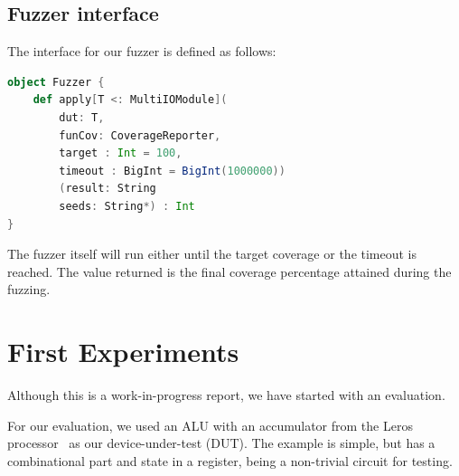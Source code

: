 \documentclass[conference]{IEEEtran}
\newcommand{\todo}[1]{{\color{olive} TODO: #1}}
\newcommand{\martin}[1]{{\color{blue} Martin: #1}}
\begin{document}

\subsection{Fuzzer interface}
The interface for our fuzzer is defined as follows:
\begin{lstlisting}[captionpos=b,caption={Interface for the ChiselVerify fuzzer. It takes as parameter a \texttt{dut} and \texttt{chiselverify.coverage.CoverageReporter}, which is the verification plan used to define the functional coverage that will drive the fuzzing. It also takes in a target coverage percentage between 0 and 100, which defaults to 100, and a timeout which is set by default to 1'000'000 inputs. The second set of parameters are a result output file name, where all of the interesting tests and their resulting hit values will be written, as well as a variable number of file paths, which will be used as seeds for the mutation engine. },label={lst:dutexample},language=scala]
object Fuzzer {
    def apply[T <: MultiIOModule](
        dut: T, 
        funCov: CoverageReporter, 
        target : Int = 100,
        timeout : BigInt = BigInt(1000000))
        (result: String
        seeds: String*) : Int
}
\end{lstlisting}
The fuzzer itself will run either until the target coverage or the timeout is reached. The value returned is the final coverage percentage attained during the fuzzing.

\section{First Experiments}
\label{sec:eval}
%

Although this is a work-in-progress report, we have started with an evaluation.

For our evaluation, we used an ALU with an accumulator from the Leros processor~\cite{leros:arcs2019}
as our device-under-test (DUT).
The example is simple, but has a combinational part and state in a register, being
a non-trivial circuit for testing.
\end{document}
